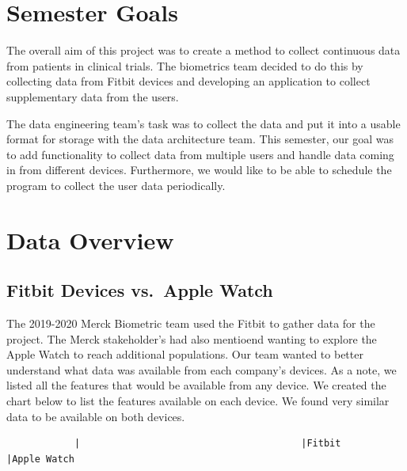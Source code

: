 \documentclass[]{book}
\begin{document}
\section{Semester Goals}\label{semester-goals}

The overall aim of this project was to create a method to collect
continuous data from patients in clinical trials. The biometrics team
decided to do this by collecting data from Fitbit devices and developing
an application to collect supplementary data from the users.

The data engineering team's task was to collect the data and put it into
a usable format for storage with the data architecture team. This
semester, our goal was to add functionality to collect data from
multiple users and handle data coming in from different devices.
Furthermore, we would like to be able to schedule the program to collect
the user data periodically.

\section{Data Overview}\label{data-overview}

\subsection{Fitbit Devices vs.~Apple
Watch}\label{fitbit-devices-vs.apple-watch}

The 2019-2020 Merck Biometric team used the Fitbit to gather data for
the project. The Merck stakeholder's had also mentioend wanting to
explore the Apple Watch to reach additional populations. Our team wanted
to better understand what data was available from each company's
devices. As a note, we listed all the features that would be available
from any device. We created the chart below to list the features
available on each device. We found very similar data to be available on
both devices.

\begin{verbatim}
            |                                       |Fitbit         |Apple Watch
\end{verbatim}
\end{document}
